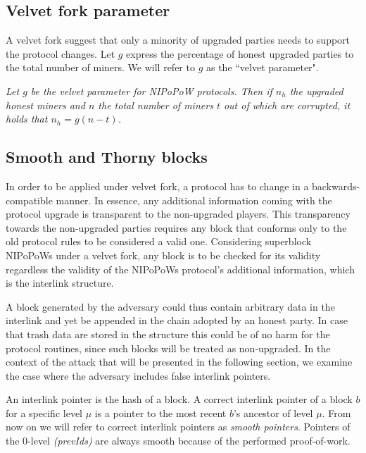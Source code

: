 \subsection{Velvet fork parameter}
A velvet fork suggest that only a minority of upgraded parties needs to support the protocol changes. Let $g$ express the percentage of honest upgraded parties to the total number of miners. We will refer to $g$ as the ``velvet parameter".

\begin{definition}
	\textit{Let $g$ be the velvet parameter for NIPoPoW protocols. Then if $n_h$ the upgraded honest miners and $n$ the total number of miners $t$ out of which are corrupted, it holds that $n_h = g (n - t)$.}
	\label{defn:velvet_honest_majority}
\end{definition}

\subsection{Smooth and Thorny blocks}
In order to be applied under velvet fork, a protocol has to change in a
backwards-compatible manner. In essence, any additional information coming
with the protocol upgrade is transparent to the non-upgraded players. This
transparency towards the non-upgraded parties requires any block that conforms
only to the old protocol rules to be considered a valid one. Considering superblock NIPoPoWs under a velvet fork, any block is to be checked for its validity
regardless the validity of the NIPoPoWs protocol's additional information,
which is the interlink structure.

A block generated by the adversary could thus contain arbitrary data in the interlink
and yet be appended in the chain adopted by an honest party. In case that trash
data are stored in the structure this could be of no harm for the protocol routines,
since such blocks will be treated as non-upgraded. In the context of the attack
that will be presented in the following section, we examine the case where the
adversary includes false interlink pointers. 

An interlink pointer is the hash of a block. A correct interlink pointer of a block $b$
for a specific level $\mu$ is a pointer to the most recent $b$'s ancestor of level
$\mu$. From now on we will refer to correct interlink pointers as \emph{smooth pointers}.
Pointers of the 0-level \textit{(prevIds)} are always smooth because of the
performed proof-of-work.

